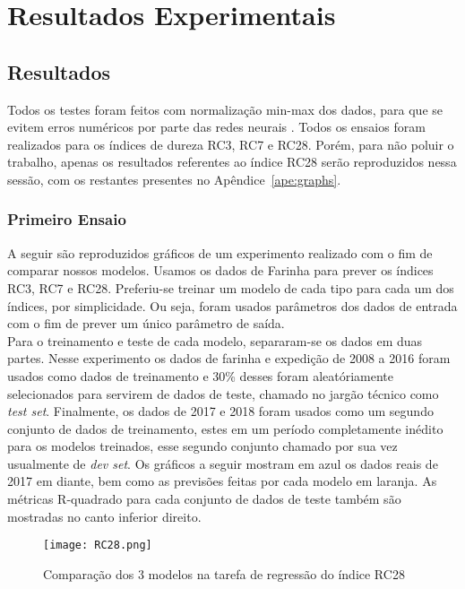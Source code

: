 \chapter{Resultados Experimentais }
\label{cap:resultados}

\section{Resultados}


Todos os testes foram feitos com normalização min-max dos dados, para que se
evitem erros numéricos por parte das redes neurais \citep{dlbook}. Todos os ensaios
foram realizados para os índices de dureza RC3, RC7 e RC28. Porém, para não
poluir o trabalho, apenas os
resultados referentes ao índice RC28 serão reproduzidos nessa sessão, com os
restantes presentes no Apêndice~\ref{ape:graphs}.\\


\subsection{Primeiro Ensaio}
A seguir são reproduzidos gráficos de um experimento realizado com o fim de
comparar nossos modelos. Usamos os dados de Farinha para prever os índices RC3,
RC7 e RC28. Preferiu-se treinar um modelo de cada tipo para cada um dos
índices, por simplicidade. Ou seja, foram usados parâmetros dos dados de entrada
com o fim de prever um único parâmetro de saída. \\ 
Para o treinamento e teste de cada modelo, separaram-se os dados em duas partes. Nesse experimento os dados de farinha e expedição de 2008 a 2016 foram usados como dados de treinamento e 30\% desses foram aleatóriamente selecionados para servirem de dados de teste, chamado no jargão técnico como \textit{test set}. Finalmente, os dados de 2017 e 2018 foram usados como um segundo conjunto de dados de treinamento, estes em um período completamente inédito para os modelos treinados, esse segundo conjunto chamado por sua vez usualmente de \textit{dev set}. Os gráficos a seguir mostram em azul os dados reais de 2017 em diante, bem como as previsões feitas por cada modelo em laranja. As métricas R-quadrado para cada conjunto de dados de teste também são mostradas no canto inferior direito.

\begin{figure}[H]
\centering
\texttt{[image: RC28.png]}
\caption{Comparação dos 3 modelos na tarefa de regressão do índice RC28}
\end{figure}

